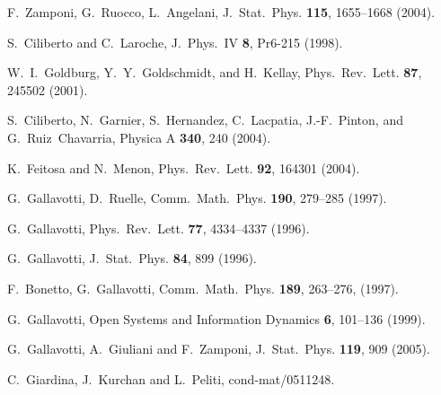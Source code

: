 \documentclass[pre,aps]{revtex4}
\begin{document}
\begin{thebibliography}{99}
 F.~Zamponi, G.~Ruocco, L.~Angelani,
J.~Stat.~Phys. {\bf 115}, 1655--1668 (2004).

 S.~Ciliberto and C.~Laroche,
J.~Phys.~IV {\bf 8}, Pr6-215 (1998).

 W.~I.~Goldburg, Y.~Y.~Goldschmidt, and H.~Kellay,
Phys.~Rev.~Lett. {\bf 87}, 245502 (2001).

S.~Ciliberto, N.~Garnier, S.~Hernandez, C.~Lacpatia, J.-F.~Pinton, 
and G.~Ruiz~Chavarria, 
Physica A {\bf 340}, 240 (2004).

  K.~Feitosa and N.~Menon,
Phys.~Rev.~Lett. {\bf 92}, 164301 (2004).

 G.~Gallavotti, D.~Ruelle, 
Comm.~Math.~Phys. {\bf 190}, 279--285 (1997).

 G.~Gallavotti, 
Phys.~Rev.~Lett. {\bf 77}, 4334--4337 (1996).

 G.~Gallavotti,
J.~Stat.~Phys. {\bf 84}, 899 (1996).

 F.~Bonetto, G.~Gallavotti,
Comm.~Math.~Phys. {\bf 189}, 263--276, (1997).

 G.~Gallavotti, 
Open Systems and Information Dynamics {\bf 6}, 101--136 (1999).

G.~Gallavotti, A.~Giuliani and F.~Zamponi,
J.~Stat.~Phys. {\bf 119}, 909 (2005).

 C.~Giardina, J.~Kurchan and L.~Peliti,
cond-mat/0511248.




\end{thebibliography}
\end{document}
